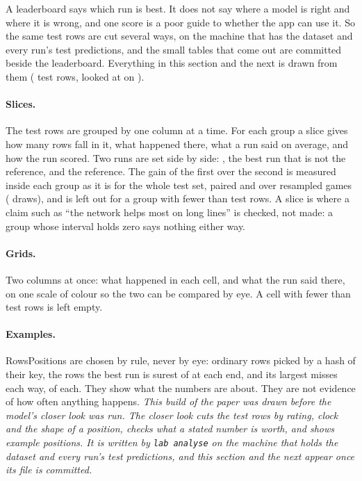 \iflook
A leaderboard says which run is best. It does not say where a model is right
and where it is wrong, and one score is a poor guide to whether the app can
use it. So the same test rows are cut several ways, on the machine that has
the dataset and every run's test predictions, and the small tables that come
out are committed beside the leaderboard. Everything in this section and the
next is drawn from them ( test rows, looked at on
).

\paragraph{Slices.}
The test rows are grouped by one column at a time. For each group a slice
gives how many rows fall in it, what happened there, what a run said on
average, and how the run scored. Two runs are set side by side: ,
the best run that is not the reference, and the reference. The gain of the
first over the second is measured inside each group as it is for the whole
test set, paired and over resampled games ( draws), and is
left out for a group with fewer than  test rows.
A slice is where a claim such as ``the network helps most on long lines'' is
checked, not made: a group whose interval holds zero says nothing either way.

\paragraph{Grids.}
Two columns at once: what happened in each cell, and what the run said there,
on one scale of colour so the two can be compared by eye. A cell with fewer
than  test rows is left empty.

\paragraph{Examples.}
\ifsequence Rows\else Positions\fi{} are chosen by rule, never by eye: ordinary rows picked by a hash of
their key, the rows the best run is surest of at each end, and its largest
misses each way,  of each. They show what the numbers are
about. They are not evidence of how often anything happens.
\else
\emph{This build of the paper was drawn before the model's closer look was
run. The closer look cuts the test rows by rating, clock and the shape of a
position, checks what a stated number is worth, and shows example positions.
It is written by \texttt{lab analyse} on the machine that holds the dataset
and every run's test predictions, and this section and the next appear once
its file is committed.}
\fi
